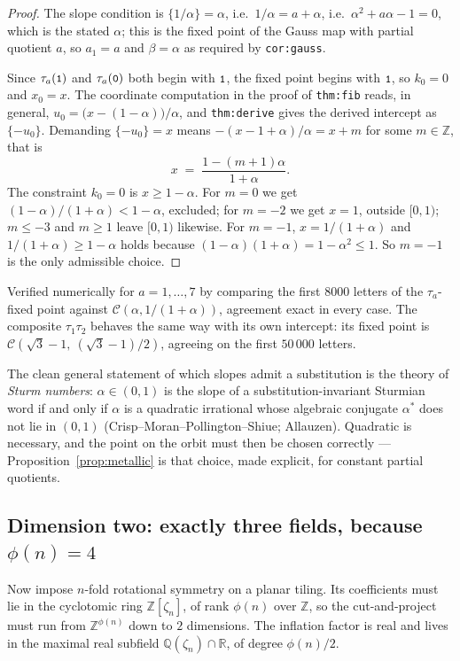 \documentclass[11pt,a4paper]{article}
\newcommand{\seq}[1]{\texttt{\small #1}}
\newcommand{\C}{\mathcal{C}}
\newcommand{\Q}{\mathbb{Q}}
\newcommand{\Z}{\mathbb{Z}}
\newcommand{\R}{\mathbb{R}}
\theoremstyle{definition}
\theoremstyle{plain}
\begin{document}
\begin{proof}
The slope condition is $\{1/\alpha\} = \alpha$, i.e.\ $1/\alpha = a + \alpha$,
i.e.\ $\alpha^2 + a\alpha - 1 = 0$, which is the stated $\alpha$; this is the
fixed point of the Gauss map with partial quotient $a$, so $a_1 = a$ and
$\beta = \alpha$ as required by \texttt{cor:gauss}.

Since $\tau_a(\seq{1})$ and $\tau_a(\seq{0})$ both begin with $\seq{1}$, the
fixed point begins with $\seq{1}$, so $k_0 = 0$ and $x_0 = x$. The coordinate
computation in the proof of \texttt{thm:fib} reads, in general,
$u_0 = \bigl(x - (1-\alpha)\bigr)/\alpha$, and \texttt{thm:derive} gives the
derived intercept as $\{-u_0\}$. Demanding $\{-u_0\} = x$ means
$-(x - 1 + \alpha)/\alpha = x + m$ for some $m \in \Z$, that is
\[
  x \;=\; \frac{1 - (m+1)\alpha}{1+\alpha} .
\]
The constraint $k_0 = 0$ is $x \geq 1 - \alpha$. For $m = 0$ we get
$(1-\alpha)/(1+\alpha) < 1-\alpha$, excluded; for $m = -2$ we get $x = 1$,
outside $[0,1)$; $m \leq -3$ and $m \geq 1$ leave $[0,1)$ likewise. For
$m = -1$, $x = 1/(1+\alpha)$ and $1/(1+\alpha) \geq 1-\alpha$ holds because
$(1-\alpha)(1+\alpha) = 1 - \alpha^2 \leq 1$. So $m = -1$ is the only
admissible choice.
\end{proof}

Verified numerically for $a = 1, \dots, 7$ by comparing the first $8000$ letters
of the $\tau_a$-fixed point against $\C(\alpha, 1/(1+\alpha))$, agreement exact
in every case. The composite $\tau_1 \tau_2$ behaves the same way with its own
intercept: its fixed point is
$\C\!\left(\sqrt 3 - 1,\ (\sqrt 3 - 1)/2\right)$, agreeing on the first
$50\,000$ letters.

The clean general statement of which slopes admit a substitution is the theory
of \emph{Sturm numbers}: $\alpha \in (0,1)$ is the slope of a
substitution-invariant Sturmian word if and only if $\alpha$ is a quadratic
irrational whose algebraic conjugate $\alpha^*$ does not lie in $(0,1)$
(Crisp--Moran--Pollington--Shiue; Allauzen). Quadratic is necessary, and the
point on the orbit must then be chosen correctly ---
Proposition~\ref{prop:metallic} is that choice, made explicit, for constant
partial quotients.

\subsection{Dimension two: exactly three fields, because $\phi(n) = 4$}

Now impose $n$-fold rotational symmetry on a planar tiling. Its coefficients
must lie in the cyclotomic ring $\Z[\zeta_n]$, of rank $\phi(n)$ over $\Z$, so
the cut-and-project must run from $\Z^{\phi(n)}$ down to $2$ dimensions. The
inflation factor is real and lives in the maximal real subfield
$\Q(\zeta_n) \cap \R$, of degree $\phi(n)/2$.
\end{document}
